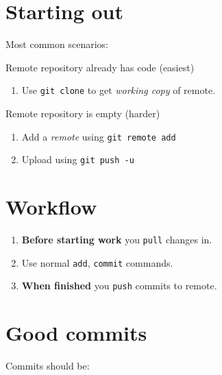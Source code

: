 \documentclass[slides]{pgnotes}
\begin{document}
\newpage
\section{Starting out}
Most common scenarios:
\begin{hlbox}{Remote repository already has code (easiest)}
  \begin{enumerate}
  \item Use \texttt{git clone} to get \textit{working copy} of remote.
  \end{enumerate}
\end{hlbox}
\begin{hlbox}{Remote repository is empty (harder)}
  \begin{enumerate}
  \item Add a \textit{remote} using \texttt{git remote add}
  \item Upload using \texttt{git push -u}
  \end{enumerate}
\end{hlbox}

\section{Workflow}
\begin{enumerate}
\item \textbf{Before starting work} you \texttt{pull} changes in.
\item Use normal \texttt{add}, \texttt{commit} commands.
\item \textbf{When finished} you \texttt{push} commits to remote.
\end{enumerate}

\section{Good commits}

Commits should be:
\end{document}
